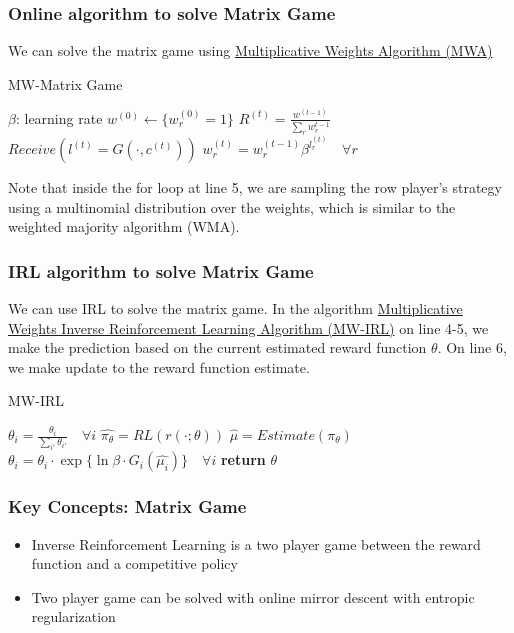 \documentclass[11pt]{article}
\begin{document}
\subsubsection{Online algorithm to solve Matrix Game}
We can solve the matrix game using \hyperref[alg:mwmg]{Multiplicative Weights Algorithm (MWA)} 
\begin{algorithm}
\caption{MW-Matrix Game}
\label{alg:mwmg}
\begin{algorithmic}[1]
\State $\beta$: learning rate
    \State $w^{(0)} \gets \{w_r^{(0)}=1\}$
    \State $R^{(t)} = \frac{w^{(t-1)}}{\sum_r w_r^{t-1}}$
    \State $Receive(l^{(t)} = G(\cdot, c^{(t)}))$
    \State $w_r^{(t)} = w_r^{(t-1)} \beta^{l_r^{(t)}} \quad \forall r$
    \EndFor
    \EndProcedure
\end{algorithmic}
\end{algorithm}
Note that inside the for loop at line 5, we are sampling the row player's strategy using a multinomial distribution over the weights, which is similar to the weighted majority algorithm (WMA).

\subsubsection{IRL algorithm to solve Matrix Game}
We can use IRL to solve the matrix game. In the algorithm \hyperref[alg:mwirl]{Multiplicative Weights Inverse Reinforcement Learning Algorithm (MW-IRL)} on line 4-5, we make the prediction based on the current estimated reward function \(\theta\). On line 6, we make update to the reward function estimate.
\begin{algorithm}
\caption{MW-IRL}
\label{alg:mwirl}
\begin{algorithmic}[1]
    \State $\theta_i = \frac{\theta_i}{\sum_{i'} \theta_{i'}} \quad \forall i$
    \State $\hat{\pi_\theta} = RL(r(\cdot; \theta))$
    \State $\hat{\mu} = Estimate(\pi_\theta)$
    \State $\theta_i = \theta_i \cdot \exp{\{\ln{\beta \cdot G_i (\hat{\mu_i})} \}} \quad \forall i$
    \EndFor
    \State \textbf{return} $\theta$
    \EndProcedure
\end{algorithmic}
\end{algorithm}

\subsubsection{Key Concepts: Matrix Game}
\begin{itemize}
    \item Inverse Reinforcement Learning is a two player game between the reward function and a competitive policy
    \item Two player game can be solved with online mirror descent with entropic regularization
\end{itemize}


{


}
\end{document}
